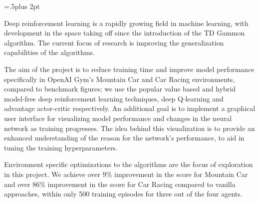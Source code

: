 \parindent=0pt\parskip=.5\baselineskip plus 2pt

\noindent Deep reinforcement learning is a rapidly growing field in machine learning, with development in the space taking off since the introduction of the TD Gammon
algorithm. The current focus of research is improving the generalization capabilities of the algorithms.

The aim of the project is to reduce training time and improve model performance
specifically in OpenAI Gym's Mountain Car and Car Racing environments, compared
to benchmark figures; we use the popular value based and hybrid model-free deep
reinforcement learning techniques, deep Q-learning and advantage actor-critic
respectively. An additional goal is to implement a graphical user interface for
visualizing model performance and changes in the neural network as training
progresses. The idea behind this visualization is to provide an enhanced
understanding of the reason for the network's performance, to aid in tuning
the training hyperparameters.

Environment specific optimizations to the algorithms are the focus of
exploration in this project. We achieve over 9\% improvement in the score for
Mountain Car and over 86\% improvement in the score for Car Racing compared to
vanilla approaches, within only 500 training episodes for three out of the four
agents.
